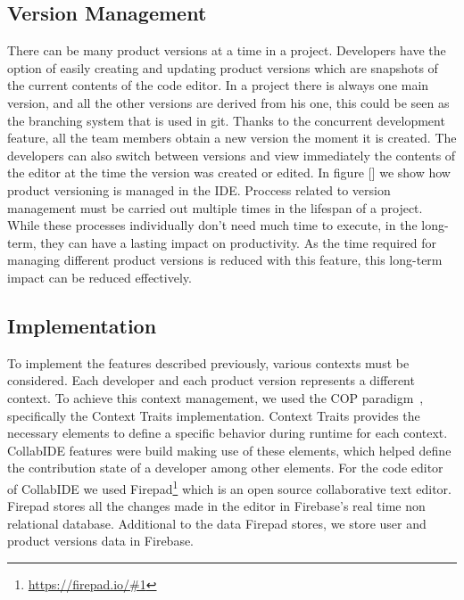 \subsection{Version Management}
There can be many product versions at a time in a project. Developers have the option of easily creating and updating product versions which are snapshots of the current contents of the code editor. In a project there is always one main version, and all the other versions are derived from his one, this could be seen as the branching system that is used in git. Thanks to the concurrent development feature, all the team members obtain a new version the moment it is created. The developers can also switch between versions and view immediately the contents of the editor at the time the version was created or edited. In figure [] we show how product versioning is managed in the IDE. Proccess related to version management must be carried out multiple times in the lifespan of a project. While these processes individually don’t need much time to execute, in the long-term, they can have a lasting impact on productivity. As the time required for managing different product versions is reduced with this feature, this long-term impact can be reduced effectively.

\subsection{Implementation}
To implement the features described previously, various contexts must be considered. Each developer 
and each product version represents a different context. To achieve this context management, we used 
the \ac{COP} paradigm~\cite{salvaneschi+12survey}, specifically the Context Traits implementation. 
Context Traits provides the necessary elements to define a specific behavior during runtime for each 
context. CollabIDE features were build making use of these elements, which helped define the 
contribution state of a developer among other elements.
For the code editor of CollabIDE we used Firepad\footnote{\url{https://firepad.io/\#1}} which is an open 
source collaborative text editor. Firepad stores all the changes made in the editor in Firebase’s real 
time non relational database. Additional to the data Firepad stores, we store user and product versions 
data in Firebase.

\endinput